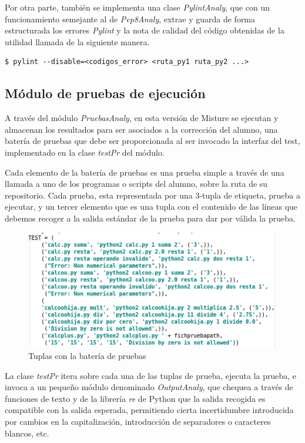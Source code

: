 Por otra parte, también se implementa una clase \textit{PylintAnaly}, que con un funcionamiento semejante al de \textit{Pep8Analy}, extrae y guarda de forma estructurada los errores \textit{Pylint} y la nota de calidad del código obtenidas de la utilidad llamada de la siguiente manera.

\begin{center}
\begin{verbatim}
$ pylint --disable=<codigos_error> <ruta_py1 ruta_py2 ...>
\end{verbatim}
\end{center}


\subsection{Módulo de pruebas de ejecución}

A través del módulo \textit{PruebasAnaly}, en esta versión de Misture se ejecutan y almacenan los resultados para ser asociados a la corrección del alumno, una batería de pruebas que debe ser proporcionada al ser invocado la interfaz del test, implementado en la clase \textit{testPr} del módulo.

Cada elemento de la batería de pruebas es una prueba simple a través de una llamada a uno de los programas o scripts del alumno, sobre la ruta de su repositorio. Cada prueba, esta representada por una 3-tupla de etiqueta, prueba a ejecutar, y un tercer elemento que es una tupla con el contenido de las líneas que debemos recoger a la salida estándar de la prueba para dar por válida la prueba.


\begin{figure}[H]
   \centering
   \includegraphics[width=16cm]{img/Selection_024_testcodigo}
   \caption{Tuplas con la batería de pruebas}
   \label{figura:testcodigo}
\end{figure}

La clase \textit{testPr} itera sobre cada una de las tuplas de prueba, ejecuta la prueba, e invoca a un pequeño módulo denominado \textit{OutputAnaly}, que chequea a través de funciones de texto y de la librería \textit{re} de Python que la salida recogida es compatible con la salida esperada, permitiendo cierta incertidumbre introducida por cambios en la capitalización, introducción de separadores o caracteres blancos, etc.

